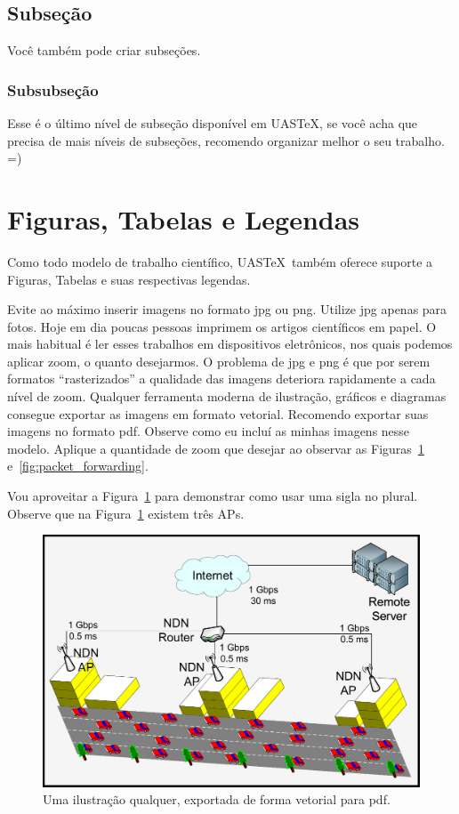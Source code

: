 \documentclass[portuguese,noindentfirst]{UASTeX} %
\begin{document}
\subsection{Subseção}

Você também pode criar subseções.

\subsubsection{Subsubseção}
Esse é o último nível de subseção disponível em UAS\TeX, se você acha que precisa de mais níveis de subseções, recomendo organizar melhor o seu trabalho. =)

\section{Figuras, Tabelas e Legendas}\label{sec:figs_tables_caps}
Como todo modelo de trabalho científico, UAS\TeX~também oferece suporte a Figuras, Tabelas e suas respectivas legendas.

Evite ao máximo inserir imagens no formato jpg ou png. Utilize jpg apenas para fotos. Hoje em dia poucas pessoas imprimem os artigos científicos em papel. O mais habitual é ler esses trabalhos em dispositivos eletrônicos, nos quais podemos aplicar zoom, o quanto desejarmos. O problema de jpg e png é que por serem formatos ``rasterizados'' a qualidade das imagens deteriora rapidamente a cada nível de zoom. Qualquer ferramenta moderna de ilustração, gráficos e diagramas consegue exportar as imagens em formato vetorial. Recomendo exportar suas imagens no formato pdf. Observe como eu incluí as minhas imagens nesse modelo. Aplique a quantidade de zoom que desejar ao observar as Figuras~\ref{fig:network_topology} e~\ref{fig:packet_forwarding}.

Vou aproveitar a Figura~\ref{fig:network_topology} para demonstrar como usar uma sigla no plural. Observe que na Figura~\ref{fig:network_topology} existem três \acp{AP}.

\begin{figure}[ht]
	\centering
	\includegraphics[width=.6\textwidth]{images/illustrations/network_topology}
	\caption{Uma ilustração qualquer, exportada de forma vetorial para pdf.}
	\label{fig:network_topology}
\end{figure}
\end{document}

